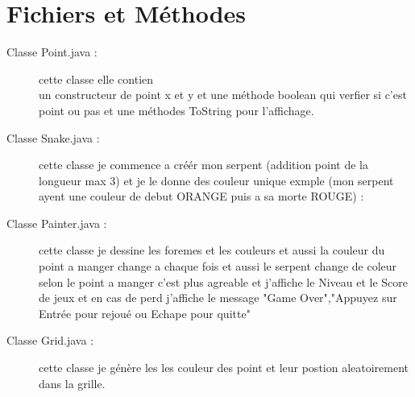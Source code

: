 \documentclass[a4paper]{report}
\begin{document}
\section{Fichiers et Méthodes}
\begin{onehalfspace}
\begin{description}
\item[Classe Point.java :\\] cette classe elle contien \\ un constructeur de point x et y et une méthode boolean qui verfier si c'est point ou pas et une méthodes ToString pour l'affichage.\\
\end{description}
\end{onehalfspace}
\begin{onehalfspace}
\begin{description}
\item[Classe Snake.java :\\] cette classe je commence a créér mon serpent (addition point de la longueur max 3) et je le donne des couleur unique exmple (mon serpent ayent une couleur de debut ORANGE puis a sa morte ROUGE)   : \\
\end{description}
\end{onehalfspace}

\begin{onehalfspace}
\begin{description}
\item[Classe Painter.java :\\] cette classe je dessine les foremes et les couleurs et aussi la couleur du point a manger change a chaque fois et aussi le serpent change de coleur selon le point a manger c'est plus agreable et j'affiche le  Niveau et le Score de jeux et en cas de perd j'affiche le message "Game Over","Appuyez sur Entrée pour rejoué ou Echape pour quitte"\\

\end{description}
\end{onehalfspace}

\begin{onehalfspace}
\begin{description}
\item[Classe Grid.java :\\] cette classe je génère les les couleur des point et leur postion aleatoirement dans la grille. \\

\end{description}
\end{onehalfspace}
\end{document}

